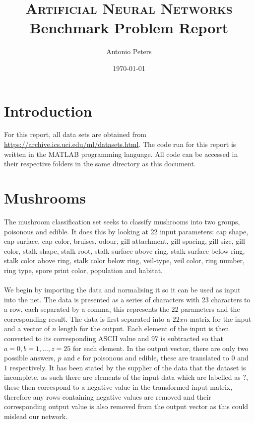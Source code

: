 \documentclass{article}%
\title{
\textsc{Artificial Neural Networks} \\ [25pt]
\huge Benchmark Problem Report \\ %
}
\author{Antonio Peters} %
\date{\today} %
\begin{document}
\maketitle %
\section{Introduction}
For this report, all data sets are obtained from \url{https://archive.ics.uci.edu/ml/datasets.html}. The code run for this report is written in the MATLAB programming language. All code can be accessed in their respective folders in the same directory as this document.
\section{Mushrooms}
The mushroom classification set seeks to classify mushrooms into two groups, poisonous and edible. It does this by looking at 22 input parameters: cap shape, cap surface, cap color, bruises, odour, gill attachment, gill spacing, gill size, gill color, stalk shape, stalk root, stalk surface above ring, stalk surface below ring, stalk color above ring, stalk color below ring, veil-type, veil color, ring number, ring type, spore print color, population and habitat. 
\\
\\
We begin by importing the data and normalising it so it can be used as input into the net. The data is presented as a series of characters with 23 characters to a row, each separated by a comma, this represents the 22 parameters and the corresponding result. The data is first separated into a $22xn$ matrix for the input and a vector of $n$ length for the output. Each element of the input is then converted to its corresponding ASCII value and $97$ is subtracted so that $a=0,b=1,...,z=25$ for each element. In the output vector, there are only two possible answers, $p$ and $e$ for poisonous and edible, these are translated to $0$ and $1$ respectively. It has been stated by the supplier of the data that the dataset is incomplete, as such there are elements of the input data which are labelled as $?$, these then correspond to a negative value in the transformed input matrix, therefore any rows containing negative values are removed and their corresponding output value is also removed from the output vector as this could mislead our network.
\\
\end{document}
